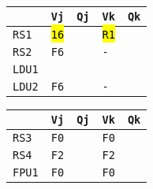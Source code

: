 \begin{enumerate}
    \begin{minipage}{0.45\textwidth}
        \centering
        \begin{tabular}{@{} l | l l l l @{}}
            \toprule
                & \texttt{Vj} & \texttt{Qj} & \texttt{Vk} & \texttt{Qk} \\
            \midrule
            \texttt{RS1} & \hl{\texttt{16}} & & \hl{\texttt{R1}} & \\ [.3em]
            \texttt{RS2} & \texttt{F6} & & \texttt{-} & \\
            \cmidrule{1-5}
            \texttt{LDU1} & & & & \\ [.3em]
            \texttt{LDU2} & \texttt{F6} & & \texttt{-} & \\
            \bottomrule
        \end{tabular}
    \end{minipage}
    \hfill
    \begin{minipage}{0.45\textwidth}
        \centering
        \begin{tabular}{@{} l | l l l l @{}}
            \toprule
            & \texttt{Vj} & \texttt{Qj} & \texttt{Vk} & \texttt{Qk} \\
            \midrule
            \texttt{RS3} & \texttt{F0} & & \texttt{F0} & \\ [.3em]
            \texttt{RS4} & \texttt{F2} & & \texttt{F2} & \\
            \cmidrule{1-5}
            \texttt{FPU1} & \texttt{F0} & & \texttt{F0} & \\
            \bottomrule
        \end{tabular}
    \end{minipage}


\end{enumerate}
